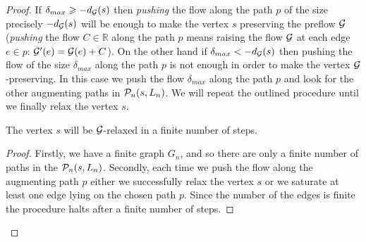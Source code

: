 \documentclass[12pt]{amsart}
\begin{document}
\begin{proof}
      If $\delta_{max} \geq -d_{\cal{G}}(s)$ then \emph{pushing} the flow along the path $p$ of the size precisely $-d_{\cal{G}}(s)$
        will be enough to make the vertex $s$ preserving the preflow $\cal{G}$
        (\emph{pushing} the flow $C \in \mathbb{R}$ along the path $p$ means raising the flow $\cal{G}$ at each edge $e \in p$:
        $\cal{G}'(e) = \cal{G}(e) + C$).
      On the other hand if $\delta_{max} < -d_{\cal{G}}(s)$ then pushing the flow of the size $\delta_{max}$ along the path $p$ is not enough
        in order to make the vertex $\cal{G}$-preserving.
      In this case we push the flow $\delta_{max}$ along the path $p$ and look for the other augmenting paths in $\gnpaths(s, L_n)$.
      We will repeat the outlined procedure until we finally relax the vertex $s$.
      \begin{prop}
        The vertex $s$ will be $\cal{G}$-relaxed in a finite number of steps.
      \end{prop}
      \begin{proof}
        Firstly, we have a finite graph $G_{n}$, and so there are only a finite number of paths in the $\gnpaths(s, L_n)$.
        Secondly, each time we push the flow along the augmenting path $p$ either we successfully relax the vertex $s$
          or we saturate at least one edge lying on the chosen path $p$.
        Since the number of the edges is finite the procedure halts after a finite number of steps.


\end{proof}
\end{proof}
\end{document}
